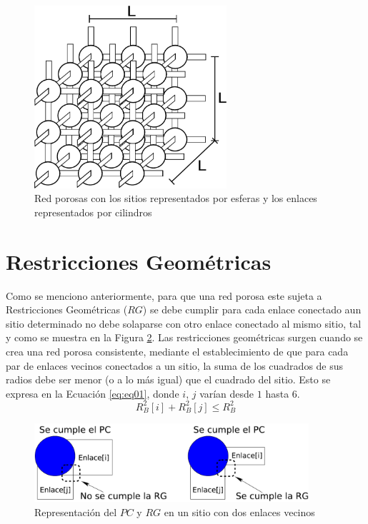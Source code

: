 \begin{figure}[hbtp]
\centering
\includegraphics[width=2.8in]{img/red.pdf}
\caption{Red porosas con los sitios representados por esferas y los enlaces representados por cilindros}
\label{fig:lattice3d}
\end{figure}

\section{Restricciones Geométricas}
\label{sec:gr}
Como se menciono anteriormente, para que una red porosa este sujeta a Restricciones Geométricas ($RG$) se debe cumplir para cada enlace conectado aun sitio determinado no debe solaparse con otro enlace conectado al mismo sitio, tal y como se muestra en la Figura \ref{fig:CPyGR}. Las restricciones geométricas surgen cuando se crea una red porosa consistente, mediante el establecimiento de que para cada par de enlaces vecinos conectados a un sitio, la suma de los cuadrados de sus radios debe ser menor (o a lo más igual) que el cuadrado del sitio. Esto se expresa en la Ecuación \ref{eq:eq01}, donde $i$, $j$ varían desde $1$ hasta $6$.\\

\begin{equation}
R_{B}^2[i]+R_{B}^2[j] \leq R_{B}^2
\label{eq:eq01}
\end{equation}

\begin{figure}[hbtp]
\centering
\includegraphics[width=4.0in]{img/CPyGC_es.pdf}
\caption{Representación del $PC$ y $RG$ en un sitio con dos enlaces vecinos}
\label{fig:CPyGR}
\end{figure}
